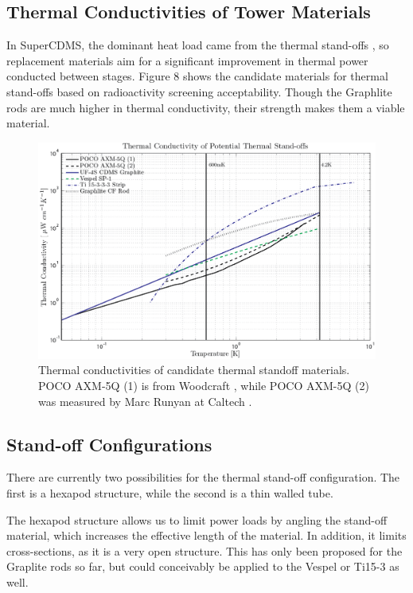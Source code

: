 \documentclass{article}
\begin{document}
\subsection{Thermal Conductivities of Tower Materials}
In SuperCDMS, the dominant heat load came from the thermal stand-offs \footnotemark, so replacement materials aim for a significant improvement in thermal power conducted between stages. Figure 8 shows the candidate materials for thermal stand-offs based on radioactivity screening acceptability. Though the Graphlite rods are much higher in thermal conductivity, their strength makes them a viable material.

\begin{figure}
\includegraphics[width = \textwidth]{Stand_off_graph.png}
\caption{Thermal conductivities of candidate thermal standoff materials. POCO AXM-5Q (1) is from Woodcraft \cite{woo:gr} , while POCO AXM-5Q (2) was measured by Marc Runyan at Caltech \cite{run}.}
\end{figure}

\subsection{Stand-off Configurations}
There are currently two possibilities for the thermal stand-off configuration. The first is a hexapod structure, while the second is a thin walled tube.

The hexapod structure allows us to limit power loads by angling the stand-off material, which increases the effective length of the material. In addition, it limits cross-sections, as it is a very open structure. This has only been proposed for the Graplite rods so far, but could conceivably be applied to the Vespel or Ti15-3 as well.
\end{document}
